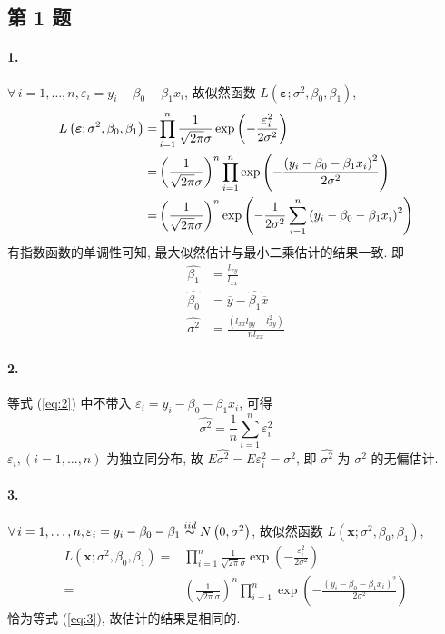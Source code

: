 \documentclass[\ROOT/main.tex]{subfiles}
\begin{document}
\subsection{第 1 题}
\noindent\paragraph*{1.}
$\forall \, i = 1, \dots, n, \varepsilon_i = y_i - \beta_0 - \beta_1 x_i$, 故似然函数 $L \left( \boldsymbol{\varepsilon}; \sigma^2, \beta_0, \beta_1 \right)$,
\begin{align} \label{eq:2}
    L \left( \boldsymbol{\varepsilon}; \sigma^2, \beta_0, \beta_1 \right)
    =& \prod_{i = 1}^{n} \frac{1}{\sqrt{2 \pi} \sigma} \exp \left( - \frac{\varepsilon_i^2}{2 \sigma^2} \right) \\
    =& \left( \frac{1}{\sqrt{2 \pi} \sigma} \right)^n \prod_{i = 1}^{n} \exp \left( - \frac{\left( y_i - \beta_0 - \beta_1 x_i \right)^2}{2 \sigma^2} \right) \label{eq:3} \\
    =& \left( \frac{1}{\sqrt{2 \pi} \sigma} \right)^n \exp \left( - \frac{1}{2 \sigma^2} \sum_{i = 1}^{n} \left( y_i - \beta_0 - \beta_1 x_i \right)^2 \right) \notag
\end{align}
有指数函数的单调性可知, 最大似然估计与最小二乘估计的结果一致.
即
\begin{align*}
    \widehat{\beta_1} &= \frac{l_{xy}}{l_{xx}} \\
    \widehat{\beta_0} &= \overline{y} - \widehat{\beta_1} \overline{x} \\
    \widehat{\sigma^2} &= \frac{\left( l_{xx} l_{yy} - l_{xy}^2 \right)}{n l_{xx}}
\end{align*}

\noindent\paragraph*{2.}
等式 (\ref{eq:2}) 中不带入 $\varepsilon_i = y_i - \beta_0 - \beta_1 x_i$, 可得
\[
    \widehat{\sigma^2} = \frac{1}{n} \sum_{i = 1}^{n} \varepsilon_i^2
\]
$\varepsilon_i, \left( i = 1, \dots, n \right)$ 为独立同分布,
故 $E \widehat{\sigma^2} = E \varepsilon_i^2 = \sigma^2$,
即 $\widehat{\sigma^2}$ 为 $\sigma^2$ 的无偏估计.

\noindent\paragraph*{3.}
$\forall \, i = 1, \dots, n, \varepsilon_i = y_i - \beta_0 - \beta_1 \overset{iid}{\thicksim} N \left( 0, \sigma^2 \right)$,
故似然函数 $L \left( \boldsymbol{x}; \sigma^2, \beta_0, \beta_1 \right)$,
\begin{align*}
    L \left( \boldsymbol{x}; \sigma^2, \beta_0, \beta_1 \right)
    =& \prod_{i = 1}^{n} \frac{1}{\sqrt{2 \pi} \sigma} \exp \left( - \frac{\varepsilon_i^2}{2 \sigma^2} \right) \\
    =& \left( \frac{1}{\sqrt{2 \pi} \sigma} \right)^n \prod_{i = 1}^{n} \exp \left( - \frac{\left( y_i - \beta_0 - \beta_1 x_i \right)^2}{2 \sigma^2} \right)
\end{align*}
恰为等式 (\ref{eq:3}), 故估计的结果是相同的.
\end{document}
